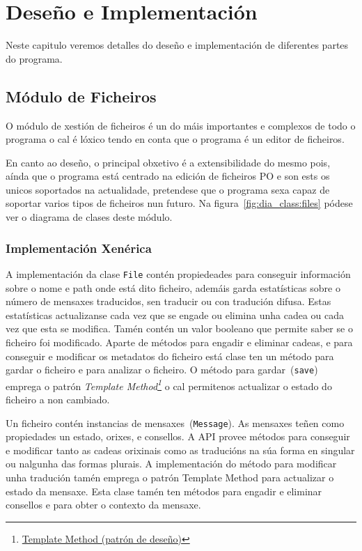 \chapter{Deseño e Implementación}

Neste capitulo veremos detalles do deseño e implementación de diferentes partes do programa.

\section{Módulo de Ficheiros}

O módulo de xestión de ficheiros é un do máis importantes e complexos de todo o programa o cal é lóxico tendo en conta que o programa é un editor de ficheiros.

En canto ao deseño, o principal obxetivo é a extensibilidade do mesmo pois, aínda que o programa está centrado na edición de ficheiros PO e son ests os unicos soportados na actualidade, pretendese que o programa sexa capaz de soportar varios tipos de ficheiros nun futuro. Na figura~\ref{fig:dia_class:files} pódese ver o diagrama de clases deste módulo.

\subsection{Implementación Xenérica}
A implementación da clase \lstinline{File} contén propiedeades para conseguir información sobre o nome e path onde está dito ficheiro, ademáis garda estatísticas sobre o número de mensaxes traducidos, sen traducir ou con tradución difusa. Estas estatísticas actualizanse cada vez que se engade ou elimina unha cadea ou cada vez que esta se modifica. Tamén contén un valor booleano que permite saber se o ficheiro foi modificado. Aparte de métodos para engadir e eliminar cadeas, e para conseguir e modificar os metadatos do ficheiro está clase ten un método para gardar o ficheiro e para analizar o ficheiro. O método para gardar~(\lstinline{save}) emprega o patrón \emph{Template Method\footnote{\href{http://gl.wikipedia.org/wiki/Template_Method_\%28patr\%C3\%B3n_de_dese\%C3\%B1o\%29}{Template Method (patrón de deseño)}}} o cal permitenos actualizar o estado do ficheiro a non cambiado.

Un ficheiro contén instancias de mensaxes~(\lstinline{Message}). As mensaxes teñen como propiedades un estado, orixes, e consellos. A API provee métodos para conseguir e modificar tanto as cadeas orixinais como as traducións na súa forma en singular ou nalgunha das formas plurais. A implementación do método para modificar unha tradución tamén emprega o patrón Template Method para actualizar o estado da mensaxe. Esta clase tamén ten métodos para engadir e eliminar consellos e para obter o contexto da mensaxe.

